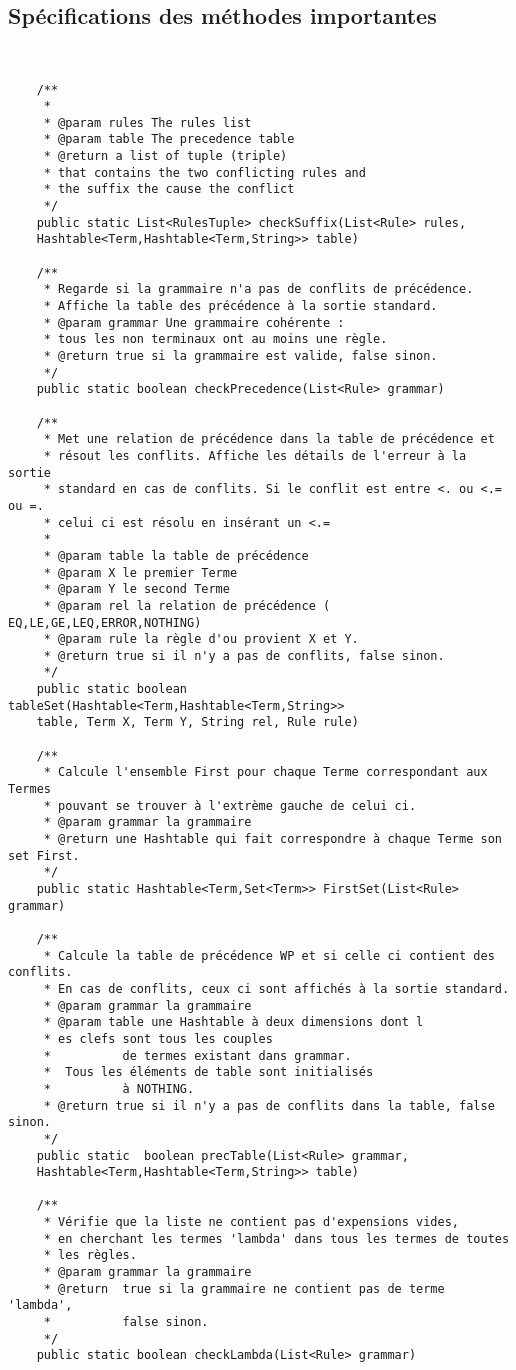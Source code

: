	\subsection{Spécifications des méthodes importantes}
{\small
\begin{verbatim}


 	/**
	 * 
	 * @param rules The rules list
	 * @param table The precedence table
	 * @return a list of tuple (triple) 
	 * that contains the two conflicting rules and 
	 * the suffix the cause the conflict
	 */
	public static List<RulesTuple> checkSuffix(List<Rule> rules, 
	Hashtable<Term,Hashtable<Term,String>> table)
	
	/**
	 * Regarde si la grammaire n'a pas de conflits de précédence.
	 * Affiche la table des précédence à la sortie standard.
	 * @param grammar Une grammaire cohérente : 
	 * tous les non terminaux ont au moins une règle. 
	 * @return true si la grammaire est valide, false sinon.
	 */
	public static boolean checkPrecedence(List<Rule> grammar)
	
	/**
	 * Met une relation de précédence dans la table de précédence et
	 * résout les conflits. Affiche les détails de l'erreur à la sortie
	 * standard en cas de conflits. Si le conflit est entre <. ou <.= ou =. 
	 * celui ci est résolu en insérant un <.= 
	 * 
	 * @param table la table de précédence
	 * @param X	le premier Terme
	 * @param Y le second Terme
	 * @param rel la relation de précédence ( EQ,LE,GE,LEQ,ERROR,NOTHING)
	 * @param rule la règle d'ou provient X et Y.
	 * @return true si il n'y a pas de conflits, false sinon. 
	 */
	public static boolean tableSet(Hashtable<Term,Hashtable<Term,String>> 
	table, Term X, Term Y, String rel, Rule rule)
	
	/**
	 * Calcule l'ensemble First pour chaque Terme correspondant aux Termes
	 * pouvant se trouver à l'extrème gauche de celui ci. 
	 * @param grammar la grammaire
	 * @return une Hashtable qui fait correspondre à chaque Terme son set First.
	 */
	public static Hashtable<Term,Set<Term>> FirstSet(List<Rule> grammar)
	
	/**
	 * Calcule la table de précédence WP et si celle ci contient des conflits.
	 * En cas de conflits, ceux ci sont affichés à la sortie standard.
	 * @param grammar la grammaire
	 * @param table une Hashtable à deux dimensions dont l
	 * es clefs sont tous les couples
	 * 			de termes existant dans grammar. 
	 *  Tous les éléments de table sont initialisés
	 * 			à NOTHING.
	 * @return true si il n'y a pas de conflits dans la table, false sinon. 
	 */
	public static  boolean precTable(List<Rule> grammar, 
	Hashtable<Term,Hashtable<Term,String>> table)
	
	/**
	 * Vérifie que la liste ne contient pas d'expensions vides,
	 * en cherchant les termes 'lambda' dans tous les termes de toutes
	 * les règles. 
	 * @param grammar la grammaire
	 * @return  true si la grammaire ne contient pas de terme 'lambda',
	 * 			false sinon.
	 */
	public static boolean checkLambda(List<Rule> grammar)


\end{verbatim}
}
